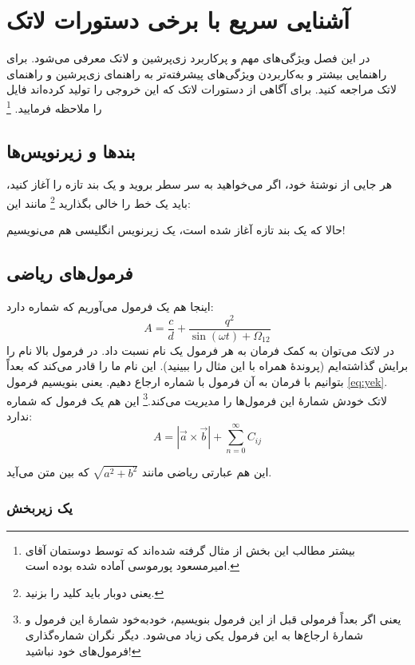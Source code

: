\chapter{آشنایی سریع با برخی دستورات لاتک}\label{Chap:latexIntro}
\thispagestyle{empty}
در این فصل ویژگی‌های مهم و پرکاربرد زی‌پرشین و لاتک معرفی می‌شود. برای راهنمایی بیشتر و به‌کاربردن ویژگی‌های پیشرفته‌تر به راهنمای زی‌پرشین و راهنمای لاتک مراجعه کنید. برای آگاهی از دستورات لاتک که این خروجی را تولید کرده‌اند فایل  را ملاحظه فرمایید.
\footnote{بیشتر مطالب این بخش از مثال 
گرفته شده‌اند که توسط دوستمان آقای امیرمسعود پورموسی آماده شده بوده است.}

\section{بندها و زیرنویس‌ها}
هر جایی از نوشتهٔ خود، اگر می‌خواهید به سر سطر بروید و یک بند تازه را آغاز کنید، باید یک خط را خالی بگذارید
\footnote{یعنی دوبار باید کلید  را بزنید.}
 مانند این:

حالا که یک بند تازه آغاز شده است، یک زیرنویس انگلیسی
 هم می‌نویسیم!
\section{فرمول‌های ریاضی}\label{formula}

اینجا هم یک فرمول می‌آوریم که شماره دارد:
\begin{equation}\label{eq:yek}
A=\frac{c}{d}+\frac{q^2}{\sin(\omega t)+\Omega_{12}}
\end{equation}
در لاتک می‌توان به کمک فرمان 
به هر فرمول یک نام نسبت داد. در فرمول بالا نام  را برایش گذاشته‌ایم (پروندهٔ  همراه با این مثال را ببینید). این نام ما را قادر می‌کند که بعداً بتوانیم با فرمان
به آن فرمول با شماره ارجاع دهیم. یعنی بنویسیم فرمول \ref{eq:yek}. 
لاتک خودش شمارهٔ این فرمول‌ها را مدیریت می‌کند.\footnote{یعنی اگر بعداً فرمولی قبل از این فرمول بنویسیم، خودبه‌خود شمارهٔ این فرمول و شمارهٔ ارجاع‌ها به این فرمول یکی زیاد می‌شود. دیگر نگران شماره‌گذاری فرمول‌های خود نباشید!} این هم یک فرمول که شماره ندارد:
$$A=|\vec{a}\times \vec{b}| + \sum_{n=0}^\infty C_{ij}$$

این هم عبارتی ریاضی مانند 
$\sqrt{a^2+b^2}$
 که بین متن می‌آید.
\subsection{یک زیربخش}\label{zirbakhsh}

